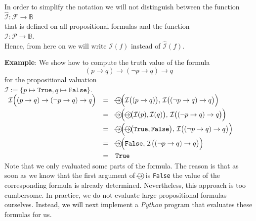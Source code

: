 In order to simplify the notation we will not distinguish between the function
\\[0.2cm]
\hspace*{1.3cm}
$\widehat{\mathcal{I}}: \mathcal{F} \rightarrow \mathbb{B}$
\\[0.2cm]
that is defined on all propositional formulas and the function
\\[0.2cm]
\hspace*{1.3cm}
$\mathcal{I}: \mathcal{P} \rightarrow \mathbb{B}$.
\\[0.2cm]
Hence, from here on we will write $\mathcal{I}(f)$ instead of $\widehat{\mathcal{I}}(f)$.

\noindent
\textbf{Example}: We show how to compute the truth value of the formula
$$  (p \rightarrow q) \rightarrow (\neg p \rightarrow q) \rightarrow q $$
for the propositional valuation
\\[0.2cm]
\hspace*{1.3cm}
$\mathcal{I} := \{ p \mapsto \mathtt{True}, q \mapsto \mathtt{False} \}$.
\\[0.2cm]
\hspace*{1.3cm}
$
  \begin{array}[b]{lcl}
   \mathcal{I}\Bigl( (p \rightarrow q) \rightarrow (\neg p \rightarrow q) \rightarrow q  \Bigr) 
   & = &  \circright\Bigl( \mathcal{I}\bigl( (p \rightarrow q) \bigr),\, \mathcal{I}\bigl((\neg p \rightarrow q) \rightarrow q\bigr) \Bigr) \\[0.2cm]
   & = & \circright\Bigl( \circright\bigl( \mathcal{I}(p), \mathcal{I}(q) \bigr),\, \mathcal{I}\bigl((\neg p \rightarrow q) \rightarrow q\bigr) \Bigr) \\[0.2cm]
   & = & \circright\Bigl( \circright\bigl( \texttt{True}, \texttt{False} \bigr),\, \mathcal{I}\bigl((\neg p \rightarrow q) \rightarrow q\bigr) \Bigr) \\[0.2cm]
   & = & \circright\Bigl( \texttt{False}, \, \mathcal{I}\bigl((\neg p \rightarrow q) \rightarrow q\bigr) \Bigr) \\[0.2cm]
   & = & \texttt{True} 
  \end{array}
$ \eox
\\[0.2cm]
Note that we only evaluated some parts of the formula.  The reason is that as soon as we know that the first
argument of $\circright$ is \texttt{False} the value of the corresponding formula is already determined.
Nevertheless, this approach is too cumbersome.  In practice, we do not evaluate large propositional formulas
ourselves.  Instead, we will next implement a \textsl{Python} program that evaluates these formulas for us.

